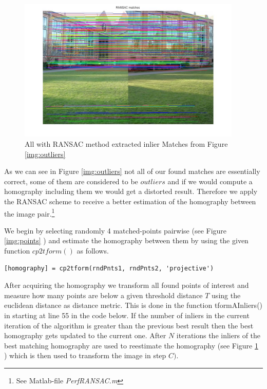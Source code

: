 \documentclass[subfigure,epsfig,fleqn,float,numbers=noenddot]{scrartcl}
\begin{document}
	\begin{figure}[H]
		\centering
		\includegraphics[width=0.95\textwidth]{./img/ransacMatches.jpg}
		\caption{All with RANSAC method extracted inlier Matches from Figure \ref{img:outliers}}
		\label{img:inliers}
	\end{figure}
As we can see in Figure \ref{img:outliers} not all of our found matches are essentially correct, some of them are considered to be $outliers$ and if we would compute a homography including them we would get a distorted result. Therefore we apply the RANSAC scheme to receive a better estimation of the homography between the image pair.\footnote{See Matlab-file \emph{PerfRANSAC.m} } 
\par We begin by selecting randomly 4 matched-points pairwise (see Figure \ref{img:points} ) and estimate the homography between them by using the given function $cp2tform()$ as follows.
\begin{lstlisting}
[homography] = cp2tform(rndPnts1, rndPnts2, 'projective') 
\end{lstlisting}
After acquiring the homography we transform all found points of interest and measure how many points are below a given threshold distance $T$ using the euclidean distance as distance metric. This is done in the function tformAInliers() in starting at line 55 in the code below. If the number of inliers in the current iteration of the algorithm is greater than the previous best result then the best homography gets updated to the current one. After $N$ iterations the inliers of the best matching homography are used to reestimate the homography (see Figure \ref{img:inliers} ) which is then used to transform the image in step $C)$. 
\end{document}
